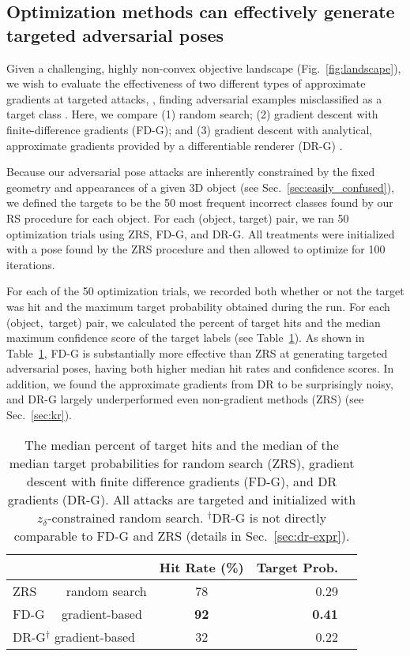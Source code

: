 \documentclass[10pt,twocolumn,letterpaper]{article}
\newcommand{\subsec}[1]{\noindent{\textbf{#1.}}}
\begin{document}
\subsection{Optimization methods can effectively generate targeted adversarial poses}
\label{sec:comparing_methods}

Given a challenging, highly non-convex objective landscape (Fig.~\ref{fig:landscape}), we wish to evaluate the effectiveness of two different types of approximate gradients at targeted attacks, \ie, finding adversarial examples misclassified as a target class \cite{szegedy2013intriguing}.
Here, we compare (1) random search; (2) gradient descent with finite-difference gradients (FD-G); and (3) gradient descent with analytical, approximate gradients provided by a differentiable renderer (DR-G) \cite{kato2018neural}.

\subsec{Experiment}
Because our adversarial pose attacks are inherently constrained by the fixed geometry and appearances of a given 3D object (see Sec.~\ref{sec:easily_confused}),
we defined the targets to be the 50 most frequent incorrect classes found by our RS procedure for each object.
For each (object, target) pair, we ran 50 optimization trials using ZRS, FD-G, and DR-G.
All treatments were initialized with a pose found by the ZRS procedure and then allowed to optimize for 100 iterations.

\subsec{Results}
For each of the 50 optimization trials, 
we recorded both whether or not the target was hit and the maximum target probability obtained during the run.
For each (object,~target) pair, we calculated the percent of target hits and the median maximum confidence score of the target labels (see Table~\ref{tab:optim_stats}).
As shown in Table~\ref{tab:optim_stats}, FD-G is substantially more effective than ZRS at generating targeted adversarial poses, having both higher median hit rates and confidence scores.
In addition, we found the approximate gradients from DR to be surprisingly noisy, and DR-G largely underperformed even non-gradient methods (ZRS) (see Sec.~\ref{sec:kr}).


\begin{table}[h]
  \centering
  \begin{tabular}{lcrr}
    \toprule
    & Hit Rate (\%) & Target Prob. \\
    \midrule
    ZRS ~~~~random search & 78 & 0.29 \\
    FD-G ~~gradient-based & \textbf{92} & \textbf{0.41} \\
    DR-G\(^\dagger\) gradient-based & 32 & 0.22 \\
    \bottomrule
  \end{tabular}
  \caption{The median percent of target hits and the median of the median target probabilities
  	for random search (ZRS), gradient descent with finite difference gradients (FD-G), and DR gradients (DR-G).
  	All attacks are targeted and initialized with $z_{\delta}$-constrained random search.
  \(^\dagger\)DR-G is not directly comparable to FD-G and ZRS
  (details in Sec.~\ref{sec:dr-expr}).
	}
  \label{tab:optim_stats}
\end{table}
\end{document}
